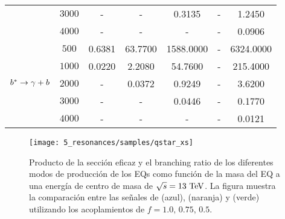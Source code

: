 \begin{table}[ht!]
{\begin{tabular}{lcccccc}
            & $3000$    & -             & -         & 0.3135        & -         & 1.2450        \\
            & $4000$    & -             & -         & -             & -         & 0.0906        \\
            \midrule
            \multirow{5}{*}{\(b^{*} \rightarrow \gamma + b\)}
            & $500$     & 0.6381        & 63.7700   & 1588.0000     & -         & 6324.0000     \\
            & $1000$    & 0.0220        & 2.2080    & 54.7600       & -         & 215.4000      \\
            & $2000$    & -             & 0.0372    & 0.9249        & -         & 3.6200        \\
            & $3000$    & -             & -         & 0.0446        & -         & 0.1770        \\
            & $4000$    & -             & -         & -             & -         & 0.0121        \\
            \bottomrule
        \end{tabular}
    }
    \label{tab:samples:samples:sig:qstar:xs}
\end{table}

\begin{figure}[ht!]
    \centering
    \texttt{[image: 5\_resonances/samples/qstar\_xs]}
    \caption{Producto de la secci\'on eficaz y el branching ratio de los diferentes modos de producci\'on de los \acp{EQ} como funci\'on de la masa del \ac{EQ} a una energ\'ia de centro de masa de \(\sqrt{s}=13~\text{TeV}\). La figura muestra la comparaci\'on entre las se\~nales de \qstar (azul), \cstar (naranja) y \bstar (verde) utilizando los acoplamientos de \(f=1.0,\, 0.75,\, 0.5\).}
    \label{fig:samples:samples:sig:qstar:xs}
\end{figure}






